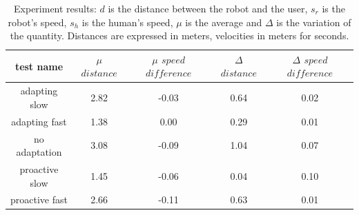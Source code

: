 \begin{table}
\caption[Experiment results on speed adaptation]{Experiment results: $d$ is the distance between the robot and the user, $s_r$ is the robot's speed, $s_h$ is the human's speed, $\mu$ is the average and $\Delta$ is the variation of the quantity. Distances are expressed in meters, velocities in meters for seconds.}
\centering
\begin{tabular}{ | c | c | c | c | c | }

\hline
  test name     & $\mu$ $distance$ & $\mu$ $speed$ $difference$ & $\Delta$ $distance$ & $\Delta$ $speed$ $difference$ \\
\hline
adapting slow & 2.82 & -0.03 & 0.64 & 0.02 \\
  \hline
  adapting fast & 1.38 & 0.00 & 0.29 & 0.01 \\
  \hline
  no adaptation & 3.08 & -0.09 & 1.04 & 0.07 \\
\hline
proactive slow & 1.45 & -0.06 & 0.04 & 0.10 \\
\hline
proactive fast & 2.66 & -0.11 & 0.63 & 0.01 \\
\hline
\end{tabular}
\label{table:case-study-spencer-experiment_results}
\end{table}

